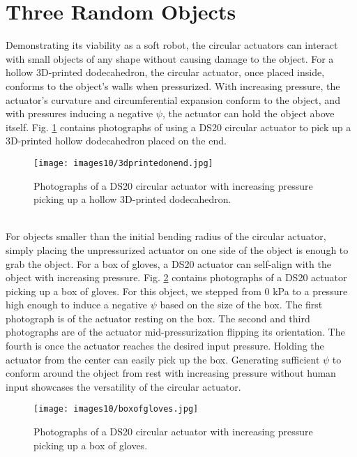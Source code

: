 \section{Three Random Objects}
Demonstrating its viability as a soft robot, the circular actuators can interact with small objects of any shape without causing damage to the object. For a hollow 3D-printed dodecahedron, the circular actuator, once placed inside, conforms to the object's walls when pressurized. With increasing pressure, the actuator's curvature and circumferential expansion conform to the object, and with pressures inducing a negative $\psi$, the actuator can hold the object above itself. Fig. \ref{fig:3dprintedonend} contains photographs of using a DS20 circular actuator to pick up a 3D-printed hollow dodecahedron placed on the end. 
\\
\begin{figure}[ht]
    \centering
    \texttt{[image: images10/3dprintedonend.jpg]}
    \caption{Photographs of a DS20 circular actuator with increasing pressure picking up a hollow 3D-printed dodecahedron.}
    \label{fig:3dprintedonend}
\end{figure}
\\
For objects smaller than the initial bending radius of the circular actuator, simply placing the unpressurized actuator on one side of the object is enough to grab the object. For a box of gloves, a DS20 actuator can self-align with the object with increasing pressure. Fig. \ref{fig:boxofgloves} contains photographs of a DS20 actuator picking up a box of gloves. For this object, we stepped from 0 kPa to a pressure high enough to induce a negative $\psi$ based on the size of the box. The first photograph is of the actuator resting on the box. The second and third photographs are of the actuator mid-pressurization flipping its orientation. The fourth is once the actuator reaches the desired input pressure. Holding the actuator from the center can easily pick up the box. Generating sufficient $\psi$ to conform around the object from rest with increasing pressure without human input showcases the versatility of the circular actuator. 
\\
\begin{figure}[ht]
    \centering
     \texttt{[image: images10/boxofgloves.jpg]}
    \caption{Photographs of a DS20 circular actuator with increasing pressure picking up a box of gloves.}
    \label{fig:boxofgloves}
\end{figure}
\\
